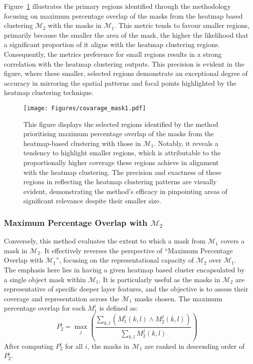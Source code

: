 Figure~\ref{Fig:covarage_mask1} illustrates the primary regions identified through the methodology focusing on maximum percentage overlap of the masks from the heatmap based clustering $\mathcal{M}_2$ with the masks in $\mathcal{M}_1$. This metric tends to favour smaller regions, primarily because the smaller the area of the mask, the higher the likelihood that a significant proportion of it aligns with the heatmap clustering regions. Consequently, the metrics preference for small regions results in a strong correlation with the heatmap clustering outputs. This precision is evident in the figure, where these smaller, selected regions demonstrate an exceptional degree of accuracy in mirroring the spatial patterns and focal points highlighted by the heatmap clustering technique.

\begin{figure}[ht!]
\begin{center}
\texttt{[image: Figures/covarage\_mask1.pdf]}
\end{center}
\caption{This figure displays the selected regions identified by the method prioritising maximum percentage overlap of the masks from the heatmap-based clustering with those in $\mathcal{M}_1$. Notably, it reveals a tendency to highlight smaller regions, which is attributable to the proportionally higher coverage these regions achieve in alignment with the heatmap clustering. The precision and exactness of these regions in reflecting the heatmap clustering patterns are visually evident, demonstrating the method's efficacy in pinpointing areas of significant relevance despite their smaller size.}
\label{Fig:covarage_mask1}
\end{figure} 

\subsubsection{Maximum Percentage Overlap with $\mathcal{M}_2$} 

Conversely, this method evaluates the extent to which a mask from $\mathcal{M}_1$ covers a mask in $\mathcal{M}_2$. It effectively reverses the perspective of ``Maximum Percentage Overlap with $\mathcal{M}_1$'', focusing on the representational capacity of \(\mathcal{M}_2\) over \(\mathcal{M}_1\). The emphasis here lies in having a given heatmap based cluster encapsulated by a single object mask within \(\mathcal{M}_1\). It is particularly useful as the masks in \(\mathcal{M}_2\) are representative of specific deeper layer features, and the objective is to assess their coverage and representation across the \(\mathcal{M}_1\) masks chosen. The maximum percentage overlap for each \( M_1^i \) is defined as:
\begin{equation*}
P_2^i = \max_j \left( \frac{\sum_{k, l} \left( M_1^i(k, l) \land M_2^j(k, l) \right)}{\sum_{k, l} M_2^j(k, l)} \right)
\end{equation*}
After computing \( P_2^i \) for all \( i \),  the masks in \(\mathcal{M}_1\) are ranked in descending order of \( P_2^i \). 

